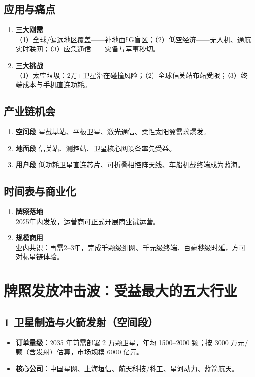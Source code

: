 \subsection{应用与痛点}
\begin{enumerate}[leftmargin=*, nosep]
    \item \textbf{三大刚需}  \\
    （1）全球/偏远地区覆盖——补地面5G盲区；（2）低空经济——无人机、通航实时联网；（3）应急通信——灾备与军事秒切。
    \item \textbf{三大挑战}  \\
    （1）太空垃圾：2万+卫星潜在碰撞风险；（2）全球信关站布站受限；（3）终端成本与手机直连功耗。
\end{enumerate}

\subsection{产业链机会}
\begin{enumerate}[leftmargin=*, nosep]
    \item \textbf{空间段}  
    星载基站、平板卫星、激光通信、柔性太阳翼需求爆发。
    \item \textbf{地面段}  
    信关站、测控站、卫星核心网设备率先受益。
    \item \textbf{用户段}  
    低功耗卫星直连芯片、可折叠相控阵天线、车船机载终端成为蓝海。
\end{enumerate}

\subsection{时间表与商业化}
\begin{enumerate}[leftmargin=*, nosep]
    \item \textbf{牌照落地}  \\
    2025年内发放，运营商可正式开展商业试运营。
    \item \textbf{规模商用}  \\
    业内共识：再需2–3年，完成千颗级组网、千元级终端、百毫秒级时延，方可对标星链体验。
\end{enumerate}

\section{牌照发放冲击波：受益最大的五大行业}

\subsection{1 卫星制造与火箭发射（空间段）}
\begin{itemize}
  \item \textbf{订单量级}：2035 年前需部署 2 万颗卫星，年均 1500–2000 颗；按 3000 万元/颗（含发射）估算，市场规模 6000 亿元。  
  \item \textbf{核心公司}：中国星网、上海垣信、航天科技/科工、星河动力、蓝箭航天。  
\end{itemize}


